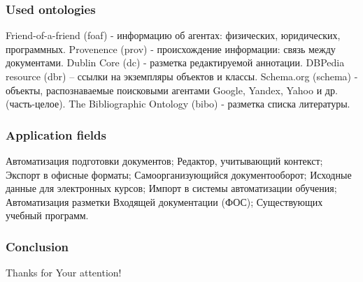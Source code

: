 \documentclass[10pt]{beamer}
\begin{document}
\begin{frame}
  \frametitle{Used ontologies}
  Friend-of-a-friend (foaf) - информацию об агентах: физических, юридических, программных.
Provenence (prov) - происхождение информации: связь между документами.
Dublin Core (dc) - разметка редактируемой аннотации.
DBPedia resource (dbr) – ссылки на экземпляры объектов и классы.
Schema.org (schema) - объекты, распознаваемые поисковыми агентами Google, Yandex, Yahoo и др. (часть-целое).
The Bibliographic Ontology (bibo) - разметка списка литературы.
\end{frame}

\begin{frame}
  \frametitle{Application fields}
  Автоматизация подготовки документов;
Редактор, учитывающий контекст;
Экспорт в офисные форматы;
Самоорганизующийся документооборот;
Исходные данные для электронных курсов;
Импорт в системы автоматизации обучения;
Автоматизация разметки
Входящей документации (ФОС);
Существующих учебный программ.

\end{frame}

\begin{frame}
  \frametitle{Conclusion}
  \centering
\end{frame}

\begin{frame}
  \vfill
  \begin{center}
    {\Huge Thanks for Your attention!}
  \end{center}
  \vfill
\end{frame}
\end{document}
